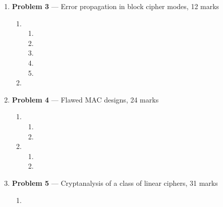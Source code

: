 \documentclass[11pt]{article}
\theoremstyle{definition}
\begin{document}
\begin{enumerate}
	
	\item[] \textbf{Problem 3} --- Error propagation in block cipher modes, 12 marks
	
	\begin{enumerate}
		\item %
		
		\begin{enumerate}
			\item %
			
			\item %
			
			\item %
			
			\item %
			
			\item %
		
		\end{enumerate}
		
		\item %
	
	\end{enumerate}
	
	
	\item[] \textbf{Problem 4} --- Flawed MAC designs, 24 marks
	
	\begin{enumerate}
	
		\item %
		
		\begin{enumerate}
			\item %
			
			\item %
		\end{enumerate}
		
		\item %
		
		\begin{enumerate}
		
			\item %
			
			\item %
		
		\end{enumerate}
	\end{enumerate}
	
	
	\item[] \textbf{Problem 5} --- Cryptanalysis of a class of linear ciphers, 31 marks
	
	
	\begin{enumerate}
	\item %
	

\end{enumerate}
\end{enumerate}
\end{document}
